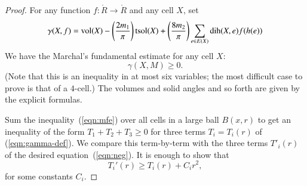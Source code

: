 \begin{proof}
For any function $f:\ring{R}\to\ring{R}$ and any cell $X$, set
\begin{equation}\label{eqn:gamma-def}
\gamma(X,f) =  {\operatorname{vol}}(X)
-\left(\frac{2m_1}{\pi}\right) {\operatorname{tsol}}(X) + \left(\frac{8m_2}{\pi}\right)
\sum_{e\in E(X)} \operatorname{dih}(X,e)  f(h(e))
\end{equation}
We have the Marchal's fundamental estimate\cite[cc:mar]{hales:2009:nonlinear} for any cell $X$:  %
\begin{equation}\label{eqn:mfe}
\gamma(X,M)\ge 0.
\end{equation}
(Note that this is an inequality in at most six variables; the most difficult case to prove is that of a $4$-cell.)  The volumes and solid angles and so forth are given by the explicit formulas.

Sum the inequality~(\ref{eqn:mfe}) over all cells in a large ball $B(x,r)$ to get an
inequality of the form $T_1 + T_2 + T_3\ge 0$ for three terms $T_i = T_i(r)$ of (\ref{eqn:gamma-def}).  We compare this term-by-term
with the three terms $T'_i(r)$ of the desired equation~(\ref{eqn:neg}). 
It is enough to show that
$$
T_i'(r) \ge T_i(r) + C_i r^2,
$$
for some constants $C_i$.


\end{proof}
